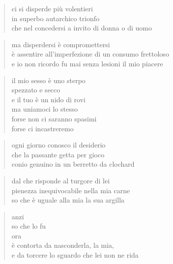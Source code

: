 \clearpage


	\begin{verse}
		ci si disperde più volentieri\\
		in superbo autarchico trionfo\\
		che nel concedersi a invito di donna o di uomo
	\end{verse}

	\begin{verse}
		ma disperdersi è compromettersi\\
		è assentire all'imperfezione di un consumo frettoloso\\
		e io non ricordo fu mai senza lesioni il mio piacere
	\end{verse}

\clearpage


	\begin{verse}
		il mio sesso è uno sterpo\\
		spezzato e secco\\
		e il tuo è un nido di rovi\\
		ma uniamoci lo stesso\\
		forse non ci saranno spasimi\\
		forse ci incastreremo
	\end{verse}

\clearpage


	\begin{verse}
		ogni giorno conosco il desiderio\\
		che la passante getta per gioco\\
		conio genuino in un berretto da clochard
	\end{verse}

	\begin{verse}
		dal che risponde al turgore di lei\\
		pienezza inequivocabile nella mia carne\\
		so che è uguale alla mia la sua argilla
	\end{verse}

	\begin{verse}
		anzi\\
		so che lo fu\\
		ora \\
		è contorta da nasconderla, la mia,\\
		e da torcere lo sguardo che lei non ne rida
	\end{verse}

